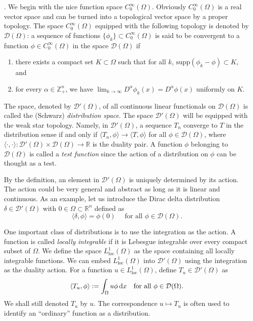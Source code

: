 \vskip0.5cm.
We begin with the nice function space $C_0^{\infty}(\Omega)$. Obviously
$C_0^{\infty}(\Omega)$ is a real vector space and can be turned into a topological vector space
by a proper topology. The space $C_0^{\infty}(\Omega)$ equipped with the following topology is denoted
by $\mathcal D(\Omega)$: a sequence of functions $\{\phi_k\}\subset C_0^{\infty}(\Omega)$ is said to be convergent to a function
$\phi\in C_0^{\infty}(\Omega)$ in the space $\mathcal D(\Omega)$ if
\begin{enumerate}
\item there exists a compact set $K\subset\Omega$
 such that for all $k$, $\textrm{supp}(\phi_k-\phi) \subset K$, and
\item for every $\alpha\in\mathbb Z_+^n$, we have $\lim_{k\to\infty}D^{\alpha}\phi_k(x) = D^{\alpha}\phi(x)$ uniformly on $K$.
\end{enumerate}

The space, denoted by $\mathcal D'(\Omega)$, of all continuous linear functionals on $\mathcal D(\Omega)$ is called the (Schwarz) {\it distribution space}. The space $\mathcal D'(\Omega)$ will be equipped with the weak star
topology. Namely, in $\mathcal D'(\Omega)$, a sequence $T_n$ converge to $T$ in the distribution sense if and only if $\langle T_n, \phi\rangle\to\langle T, \phi\rangle$ for all $\phi\in\mathcal D(\Omega)$, where $\langle\cdot, \cdot\rangle: \mathcal D'(\Omega)\times \mathcal D(\Omega)\to\mathbb R$ is the
duality pair. A function $\phi$ belonging to $\mathcal D(\Omega)$ is called a {\it test function} since the action of a
distribution on $\phi$ can be thought as a test.

\begin{example}\label{exm:diracdelta}
By the definition, an element in $\mathcal D'(\Omega)$ is uniquely determined by its action.
The action could be very general and abstract as long as it is linear and continuous. As an example, let us introduce the Dirac delta distribution $\delta\in\mathcal D'(\Omega)$ with $0\in\Omega\subset\mathbb R^n$ defined
as
\[
\langle \delta, \phi\rangle = \phi(0) \quad\textrm{ for all } \phi\in \mathcal D(\Omega).
\]
\end{example}

One important class of distributions is to use the integration as the action. A function
is called {\it locally integrable} if it is Lebesgue integrable over every compact subset of $\Omega$.
We define the space $L^1_{\textrm{loc}}(\Omega)$ as the space containing all locally integrable functions. We
can embed $L^1_{\textrm{loc}}(\Omega)$ into $\mathcal D'(\Omega)$ using the integration as the duality action. For a function
$u\in L^1_{\textrm{loc}}(\Omega)$, define $T_u\in\mathcal D'(\Omega)$ as
\[
\langle T_u, \phi\rangle:=\int_{\Omega}u\phi\,{\rm d}x\quad \textrm{for all }\phi\in\mathcal D(\Omega).
\]
We shall still denoted $T_u$ by $u$. The correspondence $u \mapsto T_u$ is often used to identify an ``ordinary'' function as a distribution.

